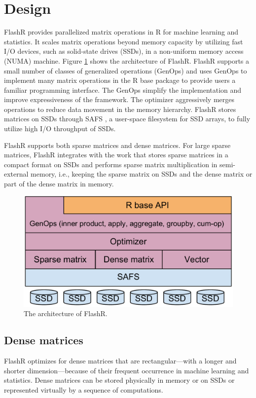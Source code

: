 \section{Design}

FlashR provides parallelized matrix operations in R for machine learning and
statistics. It scales matrix operations beyond memory capacity by utilizing
fast I/O devices, such as solid-state drives (SSDs), in a non-uniform memory
access (NUMA) machine. Figure \ref{fig:arch} shows the architecture of FlashR.
FlashR supports a small number of classes of generalized operations (GenOps)
and uses GenOps to implement many matrix operations in the R base package
to provide users a familiar programming interface. The GenOps simplify
the implementation and improve expressiveness of the framework. The optimizer
aggressively merges operations to reduce data movement in the memory hierarchy.
FlashR stores matrices on SSDs through SAFS \cite{safs}, a user-space filesystem
for SSD arrays, to fully utilize high I/O throughput of SSDs.

FlashR supports both sparse matrices and dense matrices. For large sparse matrices,
FlashR integrates with the work \cite{SEM_SpMM} that stores sparse matrices
in a compact format on SSDs and performs sparse matrix multiplication
in semi-external memory, i.e., keeping the sparse matrix on SSDs and
the dense matrix or part of the dense matrix in memory.

\begin{figure}
\centering
\includegraphics[scale=0.3]{FlashMatrix_figs/architecture.pdf}
\vspace{-5pt}
\caption{The architecture of FlashR.}
\label{fig:arch}
\vspace{-10pt}
\end{figure}

\subsection{Dense matrices}
FlashR optimizes for dense matrices that are rectangular---with
a longer and shorter dimension---because of their frequent occurrence
in machine learning and statistics. Dense matrices can be stored
physically in memory or on SSDs or represented virtually by a sequence of
computations.

